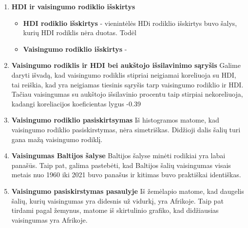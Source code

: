 \begin{enumerate}
    \item \textbf{HDI ir vaisingumo rodiklio išskirtys}
        \begin{itemize}
        \item \textbf{HDI rodiklio išskirtys} - vienintėlės HDi rodiklio išskirtys buvo šalys, kurių HDI rodiklis nėra duotas. Todėl  
        \item \textbf{Vaisingumo rodiklio išskirtys} - 
    \end{itemize}

    \item \textbf{Vaisingumo rodiklis ir HDI bei aukštojo išsilavinimo sąryšis}
    Galime daryti išvadą, kad vaisingumo rodiklis stipriai neigiamai koreliuoja su HDI, tai reiškia, kad yra neigiamas tiesinis sąryšis tarp vaisingumo rodiklio ir HDI. \\
    Tačiau vaisingumas su aukštojo išsilavinio procentu taip stirpiai nekoreliuoja, kadangi koreliacijos koeficientas lygus -0.39

    \item \textbf{Vaisingumo rodiklio pasiskirtsymas}
    Iš histogramos matome, kad vaisingumo rodiklio pasiskirstymas, nėra simetriškas. Didžioji dalis šalių turi gana mažą vaisingumo rodiklį. 

    \item \textbf{Vaisingumas Baltijos šalyse}
    Baltijos šalyse minėti rodikiai yra labai panašūs. Taip pat, galima pastebėti, kad Baltijos šalių vaisingumas visais metais nuo 1960 iki 2021 buvo panašus ir kitimas buvo praktiškai identiškas.

    \item \textbf{Vaisingumo pasiskirstymas pasaulyje}
    Iš žemėlapio matome, kad daugelis šalių, kurių vaisingumas yra didesnis už vidurkį, yra Afrikoje.
    Taip pat tirdami pagal žemynus, matome iš skirtulinio grafiko, kad didžiausias vaisingumas yra Afrikoje.
\end{enumerate}